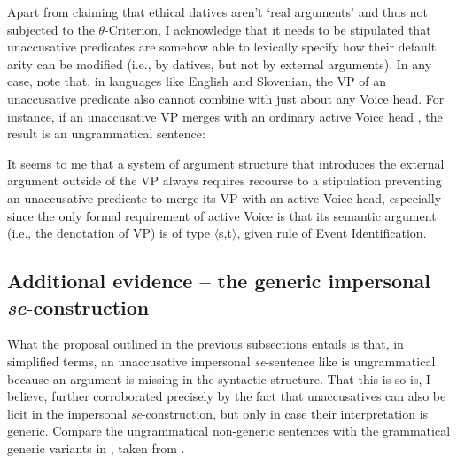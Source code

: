 \documentclass[output=paper,
modfonts,nonflat,
newtxmath
]{langsci/langscibook}
\begin{document}
\noindent Apart from claiming that ethical datives aren't `real arguments' and thus not subjected to the $\theta$-Criterion, I acknowledge that it needs to be stipulated that unaccusative predicates are somehow able to lexically specify how their default arity can be modified (i.e., by datives, but not by external arguments). In any case, note that, in languages like English and Slovenian, the VP of an unaccusative predicate also cannot combine with just about any Voice head. For instance, if an unaccusative VP merges with an ordinary active Voice head , the result is an ungrammatical sentence:

\begin{exe}
 \label{janezje}
\end{exe}

\noindent It seems to me that a system of argument structure that introduces the external argument outside of the VP always requires recourse to a stipulation preventing an unaccusative predicate to merge its  VP with an active Voice head, especially since the only formal requirement of active Voice is that its semantic argument (i.e., the denotation of VP) is of type $\langle$s,t$\rangle$, given  rule of Event Identification.   

\subsection{Additional evidence – the generic impersonal \textit{se}-construction}

What the proposal outlined in the previous subsections entails is that, in simplified terms, an unaccusative impersonal \textit{se}-sentence like  is ungrammatical because an argument is missing in the syntactic structure. That this is so is, I believe, further corroborated precisely by the fact that unaccusatives can also be licit in the impersonal \textit{se}-construction, but only in case their interpretation is generic. Compare the ungrammatical non-generic sentences  with the grammatical generic variants in , taken from \citet{ilcmarvin2016}.
\end{document}
